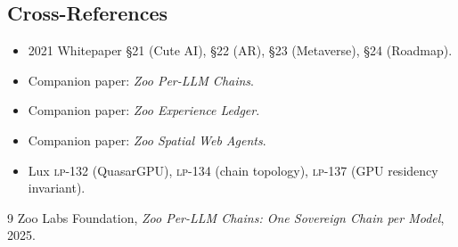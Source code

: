 \subsection{Cross-References}

\begin{itemize}[nosep,leftmargin=1.2em]
\item 2021 Whitepaper \S21 (Cute AI), \S22 (AR), \S23 (Metaverse),
  \S24 (Roadmap).
\item Companion paper: \emph{Zoo Per-LLM Chains}.
\item Companion paper: \emph{Zoo Experience Ledger}.
\item Companion paper: \emph{Zoo Spatial Web Agents}.
\item Lux \textsc{lp-132} (QuasarGPU), \textsc{lp-134} (chain
  topology), \textsc{lp-137} (GPU residency invariant).
\end{itemize}

\begin{thebibliography}{9}
 Zoo Labs Foundation, \emph{Zoo Per-LLM
Chains: One Sovereign Chain per Model}, 2025.
\end{thebibliography}

